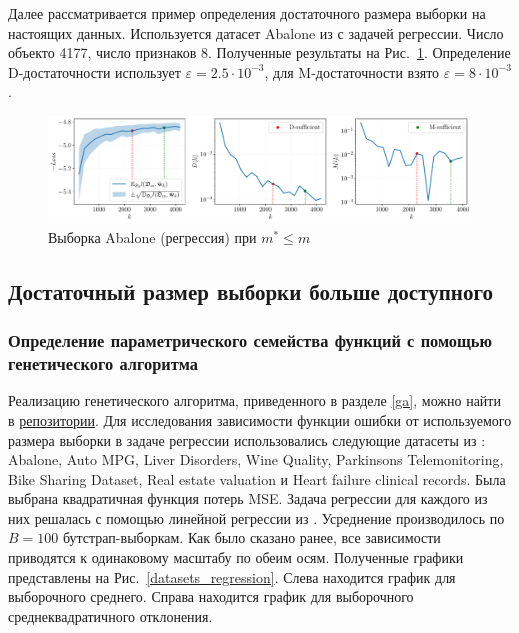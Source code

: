 Далее рассматривается пример определения достаточного размера выборки на настоящих данных. Используется датасет Abalone из \citep{UCI} с задачей регрессии. Число объекто 4177, число признаков 8. Полученные результаты на Рис.~\ref{abalone-sufficient}. Определение D-достаточности использует $\varepsilon=2.5 \cdot 10^{-3}$, для M-достаточности взято $\varepsilon=8 \cdot 10^{-3}$.

\begin{figure}[h!]
    \centering
    \includegraphics[width=\textwidth]{figures/abalone-sufficient.pdf}
    \caption{Выборка Abalone (регрессия) при $m^* \leqslant m$}
    \label{abalone-sufficient}
\end{figure}

\subsection{Достаточный размер выборки больше доступного}

\subsubsection{Определение параметрического семейства функций с помощью генетического алгоритма}

Реализацию генетического алгоритма, приведенного в разделе \ref{ga}, можно найти в \href{https://github.com/kisnikser/Bayesian-Sample-Size-Estimation/tree/main/code/genetic_algorithm}{репозитории}. Для исследования зависимости функции ошибки от используемого размера выборки в задаче регрессии использовались следующие датасеты из \citep{UCI}: Abalone, Auto MPG, Liver Disorders, Wine Quality, Parkinsons Telemonitoring, Bike Sharing Dataset, Real estate valuation и Heart failure clinical records. Была выбрана квадратичная функция потерь MSE. Задача регрессии для каждого из них решалась с помощью линейной регрессии из \citep{scikit-learn}. Усреднение производилось по $B = 100$ бутстрап-выборкам. Как было сказано ранее, все зависимости приводятся к одинаковому масштабу по обеим осям. Полученные графики представлены на Рис.~\ref{datasets_regression}. Слева находится график для выборочного среднего. Справа находится график для выборочного среднеквадратичного отклонения.

